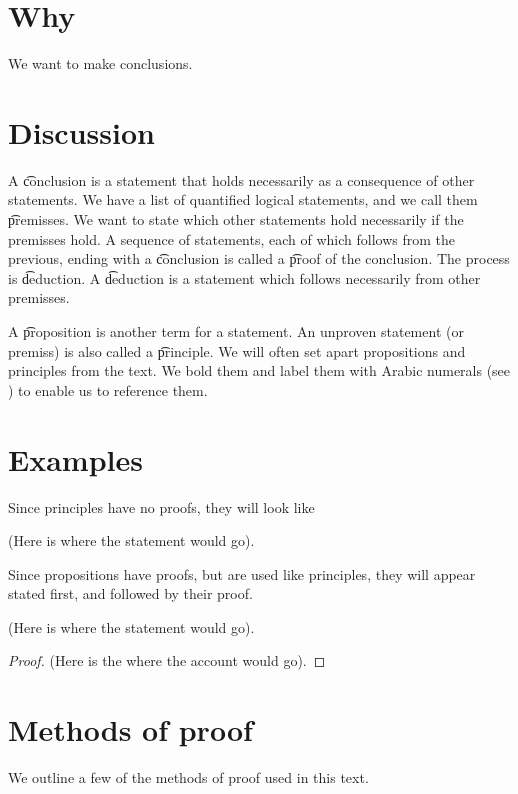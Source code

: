 
\section*{Why}

We want to make conclusions.

\section*{Discussion}

A \t{conclusion} is a statement that holds necessarily as a consequence of other statements.
We have a list of quantified logical statements, and we call them \t{premisses}.
We want to state which other statements hold necessarily if the premisses hold.
A sequence of statements, each of which follows from the previous, ending with a \t{conclusion} is called a \t{proof} of the conclusion.
The process is \t{deduction}.
A \t{deduction} is a statement which follows necessarily from other premisses.

A \t{proposition} is another term for a statement.
An unproven statement (or premiss) is also called a \t{principle}.
We will often set apart propositions and principles from the text.
We bold them and label them with Arabic numerals (see ) to enable us to reference them.

\section*{Examples}

Since principles have no proofs, they will look like
\begin{principle}
(Here is where the statement would go).
\end{principle}


Since propositions have proofs, but are used like principles, they will appear stated first, and followed by their proof.

\begin{proposition}
(Here is where the statement would go).
\begin{proof}(Here is the where the account would go).\end{proof}
\end{proposition}

\section*{Methods of proof}

We outline a few of the methods of proof used in this text.

